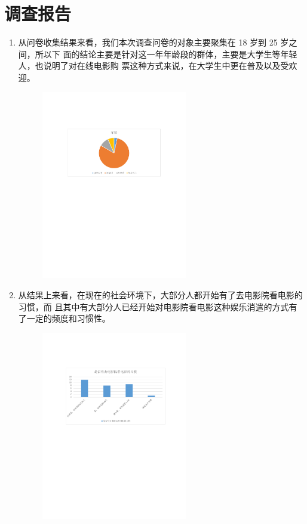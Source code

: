 \documentclass[a4paper]{article}
\begin{document}
\section{调查报告}
\begin{enumerate}
  \item 从问卷收集结果来看，我们本次调查问卷的对象主要聚集在 18 岁到 25 岁之间，所以下
面的结论主要是针对这一年年龄段的群体，主要是大学生等年轻人，也说明了对在线电影购
票这种方式来说，在大学生中更在普及以及受欢迎。
\begin{figure}[H]
  \centering
  \includegraphics[width=0.6\textwidth]{figure/1.pdf}
\end{figure}
  \item 从结果上来看，在现在的社会环境下，大部分人都开始有了去电影院看电影的习惯，而
且其中有大部分人已经开始对电影院看电影这种娱乐消遣的方式有了一定的频度和习惯性。
\begin{figure}[H]
  \centering
  \includegraphics[width=0.6\textwidth]{figure/2.pdf}

\end{figure}
\end{enumerate}
\end{document}
